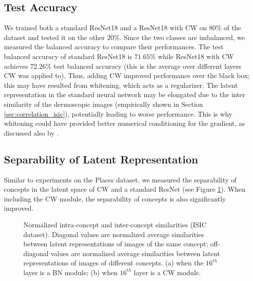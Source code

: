 \documentclass{article}
\begin{document}
\subsection{Test Accuracy}
\label{sec:acc_isic}
We trained both a standard ResNet18 and a ResNet18 with CW on $80\%$ of the dataset and tested it on the other $20\%$. Since the two classes are imbalanced, we measured the balanced accuracy to compare their performances. The test balanced accuracy of standard ResNet18 is $71.65\%$ while ResNet18 with CW achieves $72.26\%$ test balanced accuracy (this is the average over different layers CW was applied to). Thus, adding CW improved performance over the black box; this may have resulted from whitening, which acts as a regularizer. The latent representation in the standard neural network may be elongated due to the inter similarity of the dermoscopic images (empirically shown in Section \ref{sec:correlation_isic}), potentially leading to worse performance. This is why whitening could have provided better numerical conditioning for the gradient, as discussed also by \cite{huang2018decorrelated}.

\subsection{Separability of Latent Representation}
Similar to experiments on the Places dataset, we measured the separability of concepts in the latent space of CW and a standard ResNet (see Figure \ref{fig:inner_product_isic}). When including the CW module, the separability of concepts is also significantly improved.
\label{sec:inter_inner_isic}
\begin{figure}[t]
  \caption{Normalized intra-concept and inter-concept similarities (ISIC dataset). Diagonal values are normalized average similarities between latent representations of images of the same concept; off-diagonal values are normalized average  similarities between latent representations of images of different concepts. (a) when the $16^{th}$ layer is a BN module; (b) when $16^{th}$ layer is a CW module.}
  \label{fig:inner_product_isic}
\end{figure}
\end{document}
